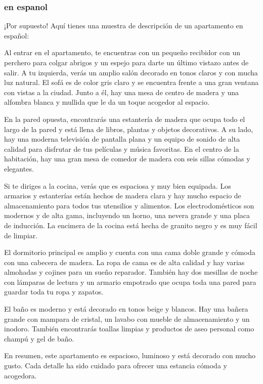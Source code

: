 \documentclass{article}
\begin{document}
\begin{multicols}{2}
\subsubsection{en espanol}
¡Por supuesto! Aquí tienes una muestra de descripción de un apartamento en
español:

Al entrar en el apartamento, te encuentras con un pequeño recibidor con un
perchero para colgar abrigos y un espejo para darte un último vistazo antes de
salir. A tu izquierda, verás un amplio salón decorado en tonos claros y con
mucha luz natural. El sofá es de color gris claro y se encuentra frente a una
gran ventana con vistas a la ciudad. Junto a él, hay una mesa de centro de
madera y una alfombra blanca y mullida que le da un toque acogedor al espacio.

En la pared opuesta, encontrarás una estantería de madera que ocupa todo el
largo de la pared y está llena de libros, plantas y objetos decorativos. A su
lado, hay una moderna televisión de pantalla plana y un equipo de sonido de
alta calidad para disfrutar de tus películas y música favoritas. En el centro
de la habitación, hay una gran mesa de comedor de madera con seis sillas
cómodas y elegantes.

Si te diriges a la cocina, verás que es espaciosa y muy bien equipada. Los
armarios y estanterías están hechos de madera clara y hay mucho espacio de
almacenamiento para todos tus utensilios y alimentos. Los electrodomésticos son
modernos y de alta gama, incluyendo un horno, una nevera grande y una placa de
inducción. La encimera de la cocina está hecha de granito negro y es muy fácil
de limpiar.

El dormitorio principal es amplio y cuenta con una cama doble grande y cómoda
con una cabecera de madera. La ropa de cama es de alta calidad y hay varias
almohadas y cojines para un sueño reparador. También hay dos mesillas de noche
con lámparas de lectura y un armario empotrado que ocupa toda una pared para
guardar toda tu ropa y zapatos.

El baño es moderno y está decorado en tonos beige y blancos. Hay una bañera
grande con mampara de cristal, un lavabo con mueble de almacenamiento y un
inodoro. También encontrarás toallas limpias y productos de aseo personal como
champú y gel de baño.

En resumen, este apartamento es espacioso, luminoso y está decorado con mucho
gusto. Cada detalle ha sido cuidado para ofrecer una estancia cómoda y
acogedora.


\end{multicols}
\end{document}

